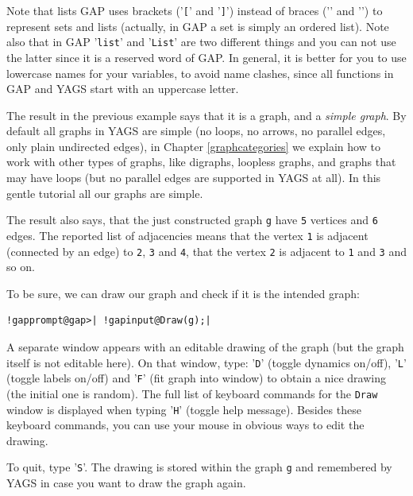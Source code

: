 \documentclass[a4paper,11pt]{report}
\begin{document}
{{Note that lists \textsf{GAP} uses brackets ('\texttt{[}' and '\texttt{]}') instead of braces ('\texttt{\texttt{}}' and '\texttt{\texttt{}}') to represent sets and lists (actually, in \textsf{GAP} a set is simply an ordered list). Note also that in \textsf{GAP} '\texttt{list}' and '\texttt{List}' are two different things and you can not use the latter since it is a
reserved word of \textsf{GAP}. In general, it is better for you to use lowercase names for your variables,
to avoid name clashes, since all functions in \textsf{GAP} and \textsf{YAGS} start with an uppercase letter. 

The result in the previous example says that it is a graph, and a \emph{simple graph}. By default all graphs in \textsf{YAGS} are simple (no loops, no arrows, no parallel edges, only plain undirected
edges), in Chapter \ref{graphcategories} we explain how to work with other types of graphs, like digraphs, loopless
graphs, and graphs that may have loops (but no parallel edges are supported in \textsf{YAGS} at all). In this gentle tutorial all our graphs are simple. 

The result also says, that the just constructed graph \texttt{g} have \texttt{5} vertices and \texttt{6} edges. The reported list of adjacencies means that the vertex \texttt{1} is adjacent (connected by an edge) to \texttt{2}, \texttt{3} and \texttt{4}, that the vertex \texttt{2} is adjacent to \texttt{1} and \texttt{3} and so on. 

To be sure, we can draw our graph and check if it is the intended graph: 


\begin{Verbatim}[commandchars=!@|,fontsize=\small,frame=single,label=Example]
  !gapprompt@gap>| !gapinput@Draw(g);|
\end{Verbatim}
 

A separate window appears with an editable drawing of the graph (but the graph
itself is not editable here). On that window, type: '\texttt{D}' (toggle dynamics on/off), '\texttt{L}' (toggle labels on/off) and '\texttt{F}' (fit graph into window) to obtain a nice drawing (the initial one is
random). The full list of keyboard commands for the \texttt{Draw} window is displayed when typing '\texttt{H}' (toggle help message). Besides these keyboard commands, you can use your
mouse in obvious ways to edit the drawing. 

To quit, type '\texttt{S}'. The drawing is stored within the graph \texttt{g} and remembered by \textsf{YAGS} in case you want to draw the graph again. 

}}
\end{document}
